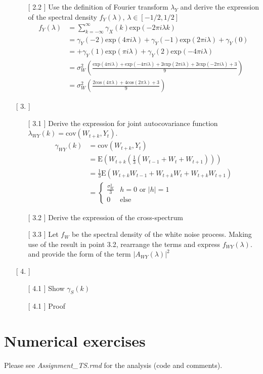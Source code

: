 \documentclass[10pt,a4paper]{article}
\begin{document}
\begin{enumerate}
\begin{enumerate}
		\item[[ 2.2]] Use the definition of Fourier transform $\lambda_Y$ and derive the expression of the spectral density $f_Y(\lambda)$, $\lambda \in \left[-1/2,1/2\right]$
		\begin{align*}
			f_Y(\lambda) &= \sum_{k=-\infty}^{\infty} \gamma_{X}(k) \text{exp}(-2\pi i \lambda k) \\
			&= \gamma_Y(-2) \text{exp}(4\pi i \lambda) + \gamma_Y(-1) \text{exp}(2\pi i \lambda) + \gamma_Y(0) \\
			&= + \gamma_Y(1) \text{exp}(\pi i \lambda) + \gamma_Y(2) \text{exp}(-4\pi i \lambda) \\
			&= \sigma_{W}^2 \left( \frac{\text{exp}(4\pi i \lambda) + \text{exp}(-4\pi i \lambda) + 2 \text{exp}(2\pi i \lambda) + 2 \text{exp}(-2\pi i \lambda) + 3 }{9}\right) \\
			&= \sigma_{W}^2 \left( \frac{2 \text{cos}(4\pi \lambda) + 4 \text{cos}(2\pi \lambda) + 3 }{9}\right)
		\end{align*}
		
		\end{enumerate}
	
	\item[[ 3.]]  \begin{enumerate}
		\item[[ 3.1]] Derive the expression for joint autocovariance function $\lambda_{WY}(k) = \text{cov}(W_{t+k},Y_t)$.
		\begin{align*}
			\gamma_{WY}(k) &= \text{cov}(W_{t+k},Y_t) \\
			&= \text{E}(W_{t+k}(\frac{1}{3}(W_{t-1}+W_{t}+W_{t+1}))) \\
			&= \frac{1}{3} \text{E}(W_{t+k}W_{t-1}+W_{t+k}W_{t}+W_{t+k}W_{t+1}) \\
			&=  	\left\{
			\begin{array}{ll}
				\frac{\sigma_{W}^2}{3} & h=0 \text{  or  } |h| = 1\\
				0 & \text{else}
			\end{array}
			\right.
		\end{align*}
		\item[[ 3.2]] Derive the expression of the cross-spectrum
		\item[[ 3.3]] Let $f_W$ be the spectral density of the white noise process. Making use of the result in point 3.2, rearrange the terms and express $f_{WY}(\lambda).$ and provide the form of the term $|A_{WY}(\lambda)|^2$
		\end{enumerate}
	\item[[ 4.]] \begin{enumerate}
		\item[[ 4.1]] Show $\gamma_S(k)$
		\item[[ 4.1]] Proof
		\end{enumerate}
	\end{enumerate}
	\section{Numerical exercises}
	Please see \textit{Assignment\_TS.rmd} for the analysis (code and comments).
\end{document}
